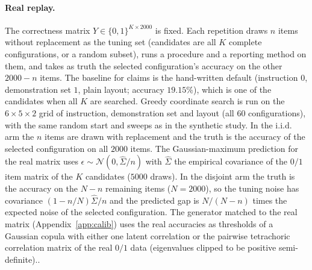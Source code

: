 \paragraph{Real replay.} The correctness matrix $Y\in\{0,1\}^{K\times2000}$ is fixed. Each repetition draws $n$ items without replacement as the tuning set (candidates are all $K$ complete configurations, or a random subset), runs a procedure and a reporting method on them, and takes as truth the selected configuration's accuracy on the other $2000-n$ items. The baseline for claims is the hand-written default (instruction $0$, demonstration set $1$, plain layout; accuracy $19.15\%$), which is one of the candidates when all $K$ are searched. Greedy coordinate search is run on the $6\times5\times2$ grid of instruction, demonstration set and layout (all $60$ configurations), with the same random start and sweeps as in the synthetic study. In the i.i.d. arm the $n$ items are drawn with replacement and the truth is the accuracy of the selected configuration on all $2000$ items. The Gaussian-maximum prediction for the real matrix uses $\epsilon\sim\mathcal N(0,\hat\Sigma/n)$ with $\hat\Sigma$ the empirical covariance of the $0/1$ item matrix of the $K$ candidates ($5000$ draws). In the disjoint arm the truth is the accuracy on the $N-n$ remaining items ($N=2000$), so the tuning noise has covariance $(1-n/N)\hat\Sigma/n$ and the predicted gap is $N/(N-n)$ times the expected noise of the selected configuration. The generator matched to the real matrix (Appendix~\ref{app:calib}) uses the real accuracies as thresholds of a Gaussian copula with either one latent correlation or the pairwise tetrachoric correlation matrix of the real $0/1$ data (eigenvalues clipped to be positive semi-definite)..

